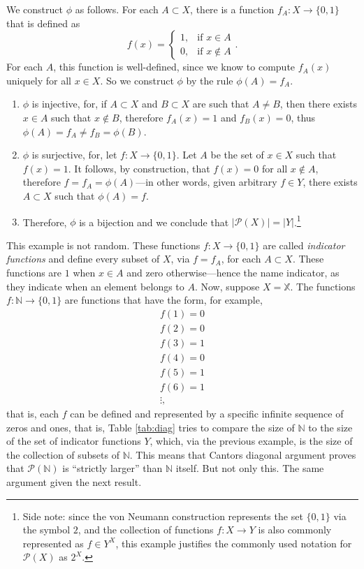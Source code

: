 \documentclass[a4paper]{article}
\theoremstyle{definition}
\begin{document}
We construct $\phi$ as follows. For each $A \subset X$, there is a function $f_A\colon X \to \{0,1\}$ that is defined as
\[
    f(x) = \begin{cases}
        1, &\text{if } x \in A \\
        0, &\text{if } x \notin A
    \end{cases}.
\]
For each $A$, this function is well-defined, since we know to compute $f_A(x)$ uniquely for all $x \in X$. So we construct $\phi$ by the rule $\phi(A) = f_A$. 
\begin{enumerate}
    \item $\phi$ is injective, for, if $A \subset X$ and $B \subset X$ are such that $A \ne B$, then there exists $x \in A$ such that $x \notin B$, therefore $f_A(x) = 1$ and $f_B(x) = 0$, thus $\phi(A) = f_A \ne f_B = \phi(B)$.
    \item $\phi$ is surjective, for, let $f\colon X \to \{0,1\}$. Let $A$ be the set of $x \in X$ such that $f(x) = 1$. It follows, by construction, that $f(x) = 0$ for all $x \notin A$, therefore $f = f_A = \phi(A)$---in other words, given arbitrary $f \in Y$, there exists $A \subset X$ such that $\phi(A) = f$.
    \item Therefore, $\phi$ is a bijection and we conclude that $|\mathcal{P}(X)| = |Y|$.\footnote{Side note: since the von Neumann construction represents the set $\{0,1\}$ via the symbol $2$, and the collection of functions $f \colon X \to Y$ is also commonly represented as $f \in Y^X$, this example justifies the commonly used notation for $\mathcal{P}(X)$ as $2^X$.}
\end{enumerate}

This example is not random. These functions $f\colon X \to \{0,1\}$ are called \emph{indicator functions} and define every subset of $X$, via $f = f_A$, for each $A \subset X$. These functions are $1$ when $x \in A$ and zero otherwise---hence the name indicator, as they indicate when an element belongs to $A$. Now, suppose $X = \mathbb{X}$. The functions $f\colon \mathbb{N} \to \{0,1\}$ are functions that have the form, for example,
\begin{gather*}
    f(1) = 0 \\
    f(2) = 0 \\
    f(3) = 1 \\
    f(4) = 0 \\
    f(5) = 1 \\
    f(6) = 1 \\
    \vdots,
\end{gather*}
that is, each $f$ can be defined and represented by a specific infinite sequence of zeros and ones, that is, Table \ref{tab:diag} tries to compare the size of $\mathbb{N}$ to the size of the set of indicator functions $Y$, which, via the previous example, is the size of the collection of subsets of $\mathbb{N}$. This means that Cantors diagonal argument proves that $\mathcal{P}(\mathbb{N})$ is ``strictly larger'' than $\mathbb{N}$ itself. But not only this. The same argument given the next result.
\end{document}
